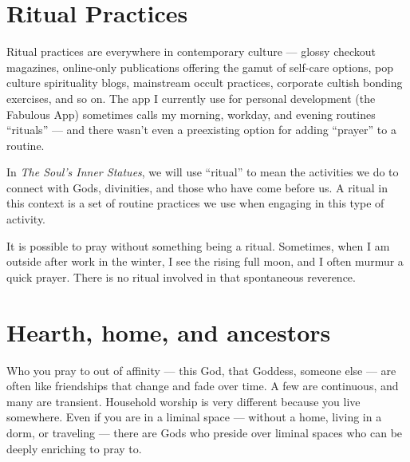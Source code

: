\documentclass[
]{book}
\begin{document}
\hypertarget{ritual-practices}{%
\section{Ritual Practices}\label{ritual-practices}}

Ritual practices are everywhere in contemporary culture --- glossy checkout magazines, online-only publications offering the gamut of self-care options, pop culture spirituality blogs, mainstream occult practices, corporate cultish bonding exercises, and so on. The app I currently use for personal development (the Fabulous App) sometimes calls my morning, workday, and evening routines ``rituals'' --- and there wasn't even a preexisting option for adding ``prayer'' to a routine.

In \emph{The Soul's Inner Statues}, we will use ``ritual'' to mean the activities we do to connect with Gods, divinities, and those who have come before us. A ritual in this context is a set of routine practices we use when engaging in this type of activity.

It is possible to pray without something being a ritual. Sometimes, when I am outside after work in the winter, I see the rising full moon, and I often murmur a quick prayer. There is no ritual involved in that spontaneous reverence.

\hypertarget{hearth-home-and-ancestors}{%
\section{Hearth, home, and ancestors}\label{hearth-home-and-ancestors}}

Who you pray to out of affinity --- this God, that Goddess, someone else --- are often like friendships that change and fade over time. A few are continuous, and many are transient. Household worship is very different because you live somewhere. Even if you are in a liminal space --- without a home, living in a dorm, or traveling --- there are Gods who preside over liminal spaces who can be deeply enriching to pray to.
\end{document}
